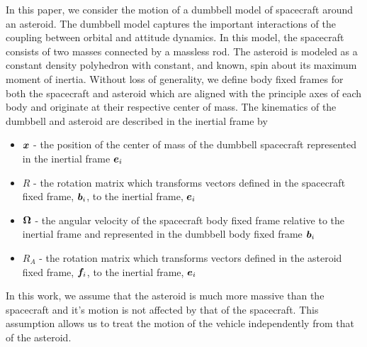 \documentclass[letterpaper, paper,11pt]{AAS}		%
\begin{document}
In this paper, we consider the motion of a dumbbell model of spacecraft around an asteroid.
The dumbbell model captures the important interactions of the coupling between orbital and attitude dynamics.
In this model, the spacecraft consists of two masses connected by a massless rod.
The asteroid is modeled as a constant density polyhedron with constant, and known, spin about its maximum moment of inertia. 
Without loss of generality, we define body fixed frames for both the spacecraft and asteroid which are aligned with the principle axes of each body and originate at their respective center of mass. 
The kinematics of the dumbbell and asteroid are described in the inertial frame by
\begin{itemize}
    \item \( \bm{x} \) - the position of the center of mass of the dumbbell spacecraft represented in the inertial frame \( \bm{e}_i\)
    \item \( R \) - the rotation matrix which transforms vectors defined in the spacecraft fixed frame, \( \bm{b}_i \), to the inertial frame, \( \bm{e}_i \)
    \item \( \bm{\Omega} \) - the angular velocity of the spacecraft body fixed frame relative to the inertial frame and represented in the dumbbell body fixed frame \( \bm{b}_i \)
    \item \( R_A \) - the rotation matrix which transforms vectors defined in the asteroid fixed frame, \( \bm{f}_i \), to the inertial frame, \( \bm{e}_i \)
\end{itemize}
In this work, we assume that the asteroid is much more massive than the spacecraft and it's motion is not affected by that of the spacecraft.
This assumption allows us to treat the motion of the vehicle independently from that of the asteroid. 
\end{document}
